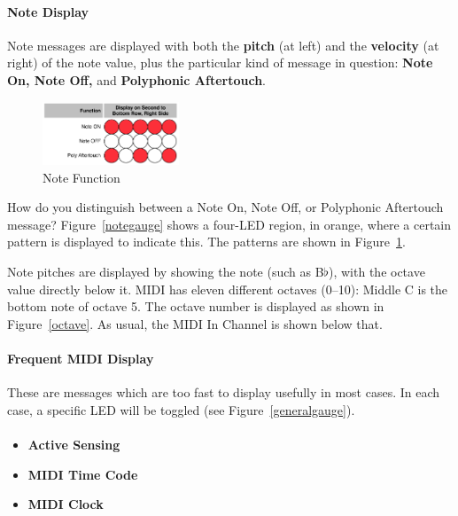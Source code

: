 \documentclass{article}
\begin{document}
\paragraph{Note Display}

Note messages are displayed with both the {\bf pitch} (at left) and the {\bf velocity} (at right) of the note value, plus the particular kind of message in question: {\bf Note On, Note Off,} and {\bf Polyphonic Aftertouch}.

\begin{figure}
\vspace{-1em}\includegraphics[width=1.6in]{notefunction.pdf}
\vspace{-2em}\caption{\small Note Function}\vspace{-2em}
\label{notefunction}
\end{figure}

How do you distinguish between a Note On, Note Off, or Polyphonic Aftertouch message?  Figure~\ref{notegauge} shows a four-LED region, in orange, where a certain pattern is displayed to indicate this.  The patterns are shown in Figure~\ref{notefunction}.

Note pitches are displayed by showing the note (such as B$\flat$), with the octave value directly below it.  MIDI has eleven different octaves (0--10): Middle C is the bottom note of octave 5.  The octave number is displayed as shown in Figure~\ref{octave}.  As usual, the MIDI In Channel is shown below that.


\paragraph{Frequent MIDI Display}  These are messages which are too fast to display usefully in most cases.  In each case, a specific LED will be toggled (see Figure~\ref{generalgauge}).

\paragraph{}\vspace{-2em}\begin{itemize}
\item {\bf Active Sensing}
\item {\bf MIDI Time Code}
\item {\bf MIDI Clock}
\end{itemize}
\end{document}
